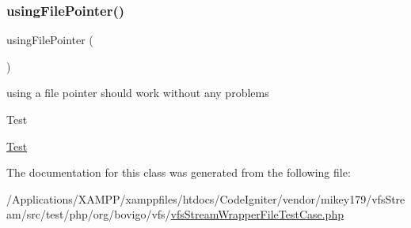 \subsubsection{\texorpdfstring{using\+File\+Pointer()}{usingFilePointer()}}
{\footnotesize\ttfamily using\+File\+Pointer (\begin{DoxyParamCaption}{ }\end{DoxyParamCaption})}

using a file pointer should work without any problems

\begin{DoxyRefDesc}{Test}
\item[\mbox{\hyperlink{test__test000178}{Test}}]\end{DoxyRefDesc}


The documentation for this class was generated from the following file\+:\begin{DoxyCompactItemize}
\item 
/\+Applications/\+X\+A\+M\+P\+P/xamppfiles/htdocs/\+Code\+Igniter/vendor/mikey179/vfs\+Stream/src/test/php/org/bovigo/vfs/\mbox{\hyperlink{vfs_stream_wrapper_file_test_case_8php}{vfs\+Stream\+Wrapper\+File\+Test\+Case.\+php}}\end{DoxyCompactItemize}
